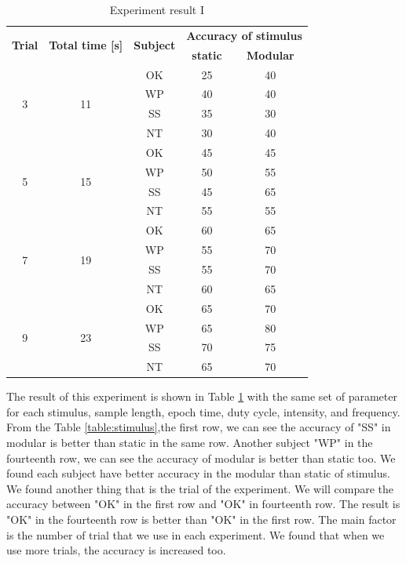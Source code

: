 \begin{table}[ht]
\centering
\begin{tabular}{| c | c | c | c | c |}

			\hline 
			\multirow{2}{*}{\textbf{Trial}} & 
  			\multirow{2}{*}{\textbf{Total time [s]}}  & 
            \multirow{2}{*}{\textbf{Subject}} &
            \multicolumn{2}{c|}{\textbf{Accuracy of stimulus}} \\
            \cline{4-5}
            &&&\multicolumn{1}{c|}{\textbf{static}} &\multicolumn{1}{c|}{\textbf{Modular}}  \\
			\hline 
			\multirow{4}{*}{3}&\multirow{4}{*}{11}&OK&25&40 \\
			\cline{3-5}
			&&WP&40&40 \\ \cline{3-5}
			&&SS&35&30 \\ \cline{3-5}
			&&NT&30&40 \\
            \hline
			\multirow{4}{*}{5}&\multirow{4}{*}{15}&OK&45&45 \\
			\cline{3-5}
			&&WP&50&55 \\ \cline{3-5}
			&&SS&45&65 \\ \cline{3-5}
			&&NT&55&55 \\
            \hline
            \multirow{4}{*}{7}&\multirow{4}{*}{19}&OK&60&65 \\
			\cline{3-5}
			&&WP&55&70 \\ \cline{3-5}
			&&SS&55&70 \\ \cline{3-5}
			&&NT&60&65 \\
            \hline 
            \multirow{4}{*}{9}&\multirow{4}{*}{23}&OK&65&70 \\
			\cline{3-5}
			&&WP&65&80 \\ \cline{3-5}
			&&SS&70&75 \\ \cline{3-5}
			&&NT&65&70 \\
            \hline 
		\end{tabular}       
\caption{Experiment result I}
\label{table:result1}
\end{table}

The result of this experiment is shown in Table \ref{table:result1} with the same set of parameter for each stimulus, sample length, epoch time, duty cycle, intensity, and frequency. From the Table \ref{table:stimulus},the first row, we can see the accuracy of "SS" in modular is better than static in the same row. Another subject "WP" in the fourteenth row, we can see the accuracy of modular is better than static too. We found each subject have better accuracy in the modular than static of stimulus. We found another thing that is the trial of the experiment. We will compare the accuracy between "OK" in the first row and "OK" in fourteenth row. The result is "OK" in the fourteenth row is better than "OK" in the first row. The main factor is the number of trial that we use in each experiment. We found that when we use more trials, the accuracy is increased too.

